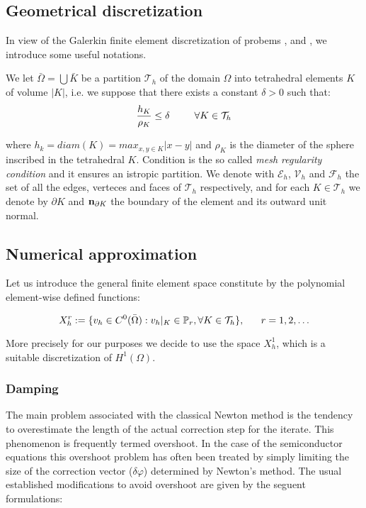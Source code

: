 



\subsection{Geometrical discretization}

In view of the Galerkin finite element discretization of probems ,  and , we introduce some useful notations.

We let $\bar{\Omega} =  \bigcup \bar{K}$ be a partition $\mathcal{T}_h$ of the domain $\Omega$ into tetrahedral elements $K$ of volume $|K|$, i.e. we suppose that there exists a constant $\delta>0$ such that:
\begin{equation}
\label{eq: mesh regular condition}
\dfrac{h_K}{\rho_K} \leq \delta \psp{15} \forall K \in \mathcal{T}_h
\end{equation}

where $h_k=diam(K)=max_{x,y\in K}|x-y|$ and $\rho_K$ is the diameter of the sphere inscribed in the tetrahedral $K$. Condition  is the so called \textit{mesh regularity condition} \cite{quarteroni:modnum} and it ensures an istropic partition.
We denote with $\mathcal{E}_h$, $\mathcal{V}_h$ and $\mathcal{F}_h$ the set of all the edges, verteces and faces  
of $\mathcal{T}_h$ respectively, and for each $K\in \mathcal{T}_h$ we denote by $\partial K$ and $\mathbf{n}_{\partial K}$ the boundary of the element and its outward unit normal.
  
\subsection{Numerical approximation}

Let us introduce the general finite element space constitute by the polynomial element-wise defined functions:

\begin{equation}
X^r_h:= \{v_h \in C^0(\bar{\Omega}): v_h|_K\in \mathbb{P}_r,\forall K \in \mathcal{T}_h \}, \psp{10} r = 1,2, . \, . \, .
\end{equation}

More precisely for our purposes we decide to use the space $X^1_h$, which is a suitable discretization of $H^1(\Omega)$.  




\subsubsection{Damping}
The main problem associated with the classical Newton method is the tendency to overestimate the length of the actual correction step for the iterate. This phenomenon is frequently termed overshoot. In the case of the semiconductor equations this overshoot problem has often been treated by simply limiting the size of the correction vector ($\delta \varphi$) determined by Newton's method. The usual established modifications to avoid overshoot are given by the seguent formulations:


